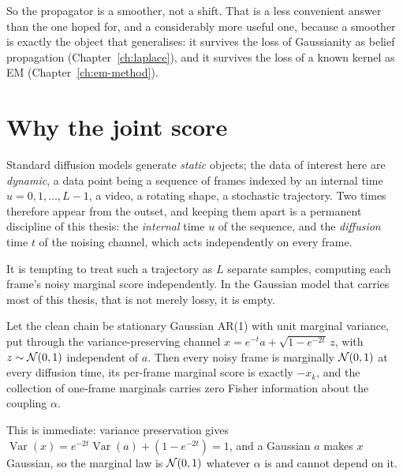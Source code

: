 So the propagator is a smoother, not a shift. That is a less convenient answer
than the one hoped for, and a considerably more useful one, because a smoother
is exactly the object that generalises: it survives the loss of Gaussianity as
belief propagation (Chapter~\ref{ch:laplace}), and it survives the loss of a
known kernel as EM (Chapter~\ref{ch:em-method}).

\section{Why the joint score}\label{sec:dev-correction}

Standard diffusion models generate \emph{static} objects; the data of
interest here are \emph{dynamic}, a data point being a sequence of frames
indexed by an internal time $u = 0, 1, \dots, L-1$, a video, a rotating
shape, a stochastic trajectory. Two times therefore appear from the outset,
and keeping them apart is a permanent discipline of this thesis: the
\emph{internal} time $u$ of the sequence, and the \emph{diffusion} time $t$
of the noising channel, which acts independently on every frame.

It is tempting to treat such a trajectory as $L$ separate samples, computing
each frame's noisy marginal score independently. In the Gaussian model that
carries most of this thesis, that is not merely lossy, it is empty.

\begin{proposition}\label{prop:dev-marginal}
Let the clean chain be stationary Gaussian AR(1) with unit marginal variance,
put through the variance-preserving channel
$x = e^{-t} a + \sqrt{1 - e^{-2t}}\, z$, with $z \sim \mathcal{N}(0,1)$ independent of
$a$. Then every noisy frame is marginally $\mathcal{N}(0,1)$ at every diffusion time,
its per-frame marginal score is exactly $-x_k$, and the collection of one-frame
marginals carries zero Fisher information about the coupling $\alpha$.
\end{proposition}

\noindent This is immediate: variance preservation gives
$\operatorname{Var}(x) = e^{-2t}\operatorname{Var}(a) + (1 - e^{-2t}) = 1$, and a Gaussian $a$ makes $x$
Gaussian, so the marginal law is $\mathcal{N}(0,1)$ whatever $\alpha$ is and cannot
depend on it.

